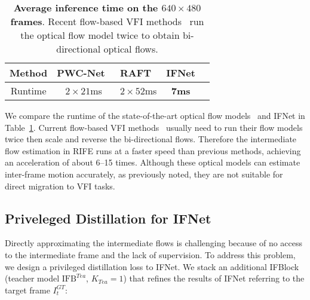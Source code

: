 \documentclass[final]{cvpr}
\def\red#1{\textcolor{MyRed}{#1}}
\def\first#1{\red{\textbf{#1}}}
\begin{document}
\begin{table}[t]
	\centering
	\begin{tabular}{ccccc}
		\hline
		Method&PWC-Net~\cite{sun2018pwc}&RAFT~\cite{teed2020raft}&IFNet\\ \hline
		Runtime & $2\times21$ms & $2\times52$ms& \first{7ms} \\ \hline
	\end{tabular}
	\caption{\textbf{Average inference time on the $640\times 480$ frames}. Recent flow-based VFI methods~\cite{jiang2018super, bao2019depth, niklaus2020softmax} run the optical flow model twice to obtain bi-directional optical flows.}\label{tab:runtime}
\end{table}






We compare the runtime of the state-of-the-art optical flow models~\cite{sun2018pwc, teed2020raft} and IFNet in Table~\ref{tab:runtime}. Current flow-based VFI methods~\cite{jiang2018super, bao2019depth, niklaus2020softmax} usually need to run their flow models twice then scale and reverse the bi-directional flows. Therefore the intermediate flow estimation in RIFE runs at a faster speed than previous methods, achieving an acceleration of about 6--15 times. Although these optical models can estimate inter-frame motion accurately, as previously noted, they are not suitable for direct migration to VFI tasks.




















\subsection{Priveleged Distillation for IFNet}

\label{subsec:leakage}

Directly approximating the intermediate flows is challenging because of no access to the intermediate frame and the lack of supervision. To address this problem, we design a privileged distillation loss to IFNet. We stack an additional IFBlock (teacher model $\text{IFB}^{Tea}$, $K_{Tea} = 1$) that refines the results of IFNet referring to the target frame $I^{GT}_t$: 
\end{document}
